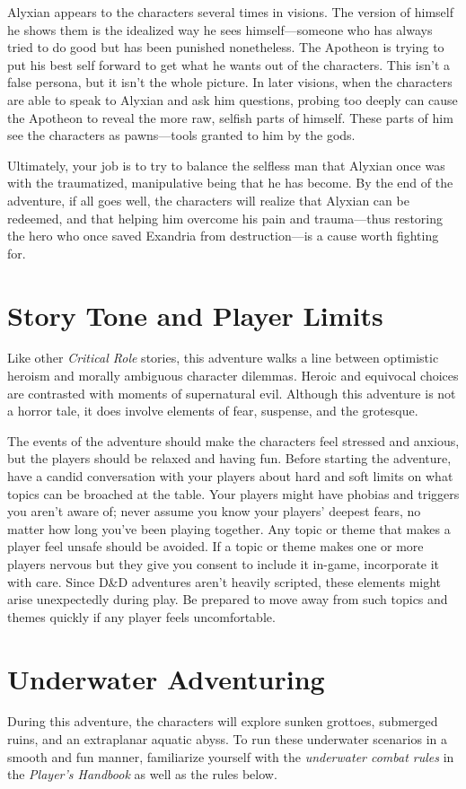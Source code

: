 \documentclass[10pt,a4paper,twoside,bg=print,twocolumn,openany,nodeprecatedcode]{dndbook}
\begin{document}
Alyxian appears to the characters several times in visions. The version of himself he shows them is the idealized way he sees himself—someone who has always tried to do good but has been punished nonetheless. The Apotheon is trying to put his best self forward to get what he wants out of the characters. This isn't a false persona, but it isn't the whole picture. In later visions, when the characters are able to speak to Alyxian and ask him questions, probing too deeply can cause the Apotheon to reveal the more raw, selfish parts of himself. These parts of him see the characters as pawns—tools granted to him by the gods.

Ultimately, your job is to try to balance the selfless man that Alyxian once was with the traumatized, manipulative being that he has become. By the end of the adventure, if all goes well, the characters will realize that Alyxian can be redeemed, and that helping him overcome his pain and trauma—thus restoring the hero who once saved Exandria from destruction—is a cause worth fighting for.

\section{Story Tone and Player Limits}
Like other \textit{Critical Role} stories, this adventure walks a line between optimistic heroism and morally ambiguous character dilemmas. Heroic and equivocal choices are contrasted with moments of supernatural evil. Although this adventure is not a horror tale, it does involve elements of fear, suspense, and the grotesque.

The events of the adventure should make the characters feel stressed and anxious, but the players should be relaxed and having fun. Before starting the adventure, have a candid conversation with your players about hard and soft limits on what topics can be broached at the table. Your players might have phobias and triggers you aren't aware of; never assume you know your players' deepest fears, no matter how long you've been playing together. Any topic or theme that makes a player feel unsafe should be avoided. If a topic or theme makes one or more players nervous but they give you consent to include it in-game, incorporate it with care. Since D\&D adventures aren't heavily scripted, these elements might arise unexpectedly during play. Be prepared to move away from such topics and themes quickly if any player feels uncomfortable.

\section{Underwater Adventuring}
During this adventure, the characters will explore sunken grottoes, submerged ruins, and an extraplanar aquatic abyss. To run these underwater scenarios in a smooth and fun manner, familiarize yourself with the \textit{underwater combat rules} in the \textit{Player's Handbook} as well as the rules below.
\end{document}
